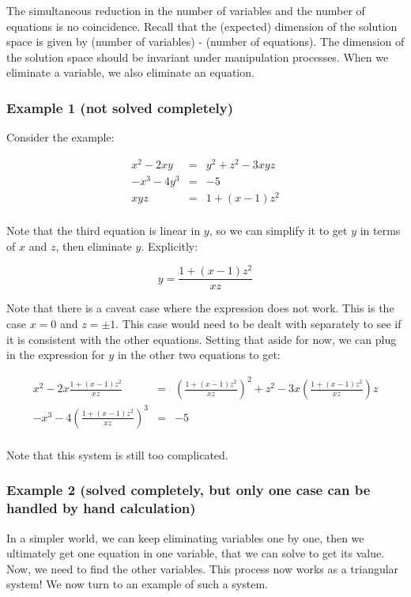 \documentclass[10pt]{amsart}
\begin{document}
The simultaneous reduction in the number of variables and the number
of equations is no coincidence. Recall that the (expected) dimension
of the solution space is given by (number of variables) - (number of
equations). The dimension of the solution space should be invariant
under manipulation processes. When we eliminate a variable, we also
eliminate an equation.

\subsubsection{Example 1 (not solved completely)}

Consider the example:

\begin{eqnarray*}
  x^2 - 2xy & = & y^2 + z^2 - 3xyz\\
  -x^3 - 4y^3 & = & -5\\
  xyz & = & 1 + (x - 1)z^2\\
\end{eqnarray*}

Note that the third equation is linear in $y$, so we can simplify it
to get $y$ in terms of $x$ and $z$, then eliminate $y$. Explicitly:

$$y = \frac{1 + (x - 1)z^2}{xz}$$

Note that there is a caveat case where the expression does not
work. This is the case $x = 0$ and $z = \pm 1$. This case would need
to be dealt with separately to see if it is consistent with the other
equations. Setting that aside for now, we can plug in the expression
for $y$ in the other two equations to get:

\begin{eqnarray*}
  x^2 - 2x\frac{1 + (x - 1)z^2}{xz} & = & \left(\frac{1 + (x - 1)z^2}{xz}\right)^2 + z^2 - 3x\left(\frac{1 + (x - 1)z^2}{xz}\right)z\\
  -x^3 - 4\left(\frac{1 + (x - 1)z^2}{xz}\right)^3 & = & -5\\
\end{eqnarray*}

Note that this system is still too complicated. 

\subsubsection{Example 2 (solved completely, but only one case can be handled by hand calculation)}

In a simpler world, we can keep eliminating variables one by one, then
we ultimately get one equation in one variable, that we can solve to
get its value. Now, we need to find the other variables. This process
now works as a triangular system! We now turn to an example of such a
system.
\end{document}
